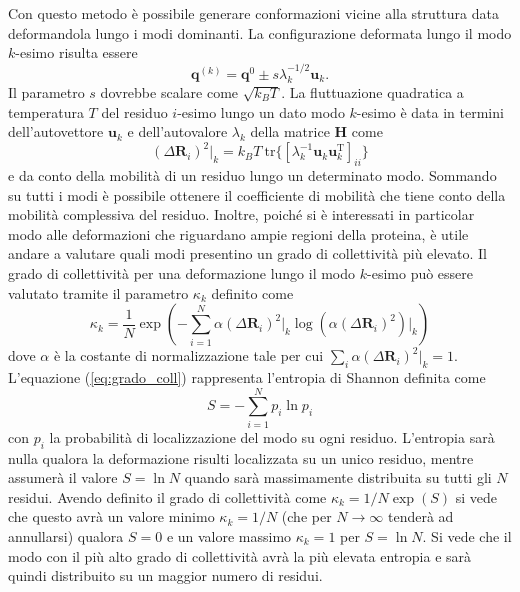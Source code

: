 Con questo metodo è possibile generare conformazioni vicine alla struttura data deformandola lungo i modi dominanti. La configurazione deformata lungo il modo $ k $-esimo risulta essere 
\begin{equation}\label{eq:deformation}
	\mathbf{q}^{(k)} = 
	\mathbf{q}^0 \pm s \lambda_{k}^{-1/2} \mathbf{u}_{k}.
\end{equation}
Il parametro $ s $ dovrebbe scalare come $\sqrt{k_B	T}$.
La fluttuazione quadratica a temperatura $ T $ del residuo $ i $-esimo lungo un dato modo $ k $-esimo è data in termini dell'autovettore $ \mathbf{u}_{k} $ e dell'autovalore $ \lambda_k $ della matrice $ \mathbf{H} $ come 
\begin{equation}\label{eq:mob}
(\Delta \mathbf{R}_i)^2 \bigg|_k = k_B	T \: \mathrm{tr} \{[ \lambda_{k}^{-1} \mathbf{u}_{k} \mathbf{u}_{k}^{\mathrm{T}} ]_{ii}\} 
\end{equation}
e da conto della mobilità di un residuo lungo un determinato modo. Sommando su tutti i modi è possibile ottenere il coefficiente di mobilità che tiene conto della mobilità complessiva del residuo. Inoltre, poiché si è interessati in particolar modo alle deformazioni che riguardano ampie regioni della proteina, è utile andare a valutare quali modi presentino un grado di collettività più elevato. Il grado di collettività per una deformazione lungo il modo $ k $-esimo può essere valutato tramite il parametro $ \kappa_k $ definito come
\begin{equation}\label{eq:grado_coll}
	\kappa_k = \frac{1}{N} \exp \left( - \sum_{i=1}^{N} \alpha 	(\Delta \mathbf{R}_i)^2 \bigg|_k \log(\alpha (\Delta \mathbf{R}_i)^2)\bigg|_k \right)
\end{equation}
dove $ \alpha $ è la costante di normalizzazione tale per cui $ \sum_i \alpha (\Delta \mathbf{R}_i)^2 \lvert_k =1 $. \cite{chem_rev}
L'equazione (\ref{eq:grado_coll}) rappresenta l'entropia di Shannon definita come 
\begin{equation}
	S=- \sum_{i=1}^N p_i \ln p_i
\end{equation}
con $ p_i $ la probabilità di localizzazione del modo su ogni residuo. L'entropia sarà nulla qualora la deformazione risulti localizzata su un unico residuo, mentre assumerà il valore $ S= \ln N $ quando sarà massimamente distribuita su tutti gli $ N $ residui. Avendo definito il grado di collettività come $ \kappa_k = 1/N \exp (S)  $ si vede che questo avrà un valore minimo $ \kappa_k = 1/N $ (che per $ N \rightarrow \infty $ tenderà ad annullarsi) qualora $ S=0 $ e un valore massimo $ \kappa_k = 1 $ per $ S= \ln N $.
Si vede che il modo con il più alto grado di collettività avrà la più elevata entropia e sarà quindi distribuito su un maggior numero di residui.